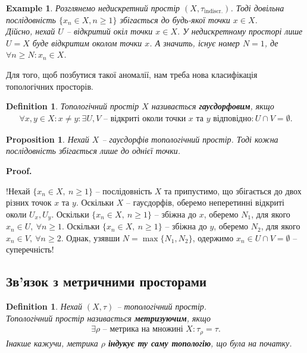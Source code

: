 \documentclass[a4paper, 10pt]{article}
\makeatletter
\theoremstyle{theoremdd}
\newtheorem{definition}[theorem]{Definition}
\newtheorem{example}[theorem]{Example}
\newtheorem{proposition}[theorem]{Proposition}
\renewenvironment{proof}[1][Proof.\\]{\par
\pushQED{\hfill \qed}%
\normalfont \topsep6\p@\@plus6\p@\relax
\trivlist
\item\relax
{\bfseries
#1\@addpunct{.}}\hspace\labelsep\ignorespaces
}{%
\popQED\endtrivlist\@endpefalse
}
\makeatother
\begin{document}
\begin{example}
Розглянемо недискретний простір $(X,\tau_{\text{indiscr.}})$. Тоді довільна послідовність $\{x_n \in X, n \geq 1\}$ збігається до будь-якої точки $x \in X$.
\bigskip \\
Дійсно, нехай $U$ -- відкритий окіл точки $x \in X$. У недискретному просторі лише $U = X$ буде відкритим околом точки $x$. А значить, існує номер $N =1$, де $\forall n \geq N: x_n \in X$.
\end{example}

\noindent Для того, щоб позбутися такої аномалії, нам треба нова класифікація топологічних просторів.

\begin{definition}
Топологічний простір $X$ називається \textbf{гаусдорфовим}, якщо
\begin{align*}
\forall x,y \in X: x \neq y: \exists U,V \text{ -- відкриті околи точки $x$ та $y$ відповідно}: U \cap V = \emptyset.
\end{align*}
\end{definition}

\begin{proposition}
Нехай $X$ -- гаусдорфів топологічний простір. Тоді кожна послідовність збігається лише до однієї точки.
\end{proposition}

\begin{proof}
!Нехай $\{x_n \in X,\ n \geq 1\}$ -- послідовність $X$ та припустимо, що збігається до двох різних точок $x$ та $y$. Оскільки $X$ -- гаусдорфів, оберемо неперетинні відкриті околи $U_x, U_y$. Оскільки $\{x_n \in X,\ n \geq 1\}$ -- збіжна до $x$, оберемо $N_1$, для якого $x_n \in U,\ \forall n \geq 1$. Оскільки $\{x_n \in X,\ n \geq 1\}$ -- збіжна до $y$, оберемо $N_2$, для якого $x_n \in V,\ \forall n \geq 2$. Однак, узявши $N = \max\{N_1,N_2\}$, одержимо $x_n \in U \cap V = \emptyset$ -- суперечність!
\end{proof}

\subsection{Зв'язок з метричними просторами}
\begin{definition}
Нехай $(X,\tau)$ -- топологічний простір.\\
Топологічний простір називається \textbf{метризуючим}, якщо
\begin{align*}
\exists \rho \text{ -- метрика на множині } X: \tau_\rho = \tau.
\end{align*}
Інакше кажучи, метрика $\rho$ \textbf{індукує ту саму топологію}, що була на початку.
\end{definition}
\end{document}
